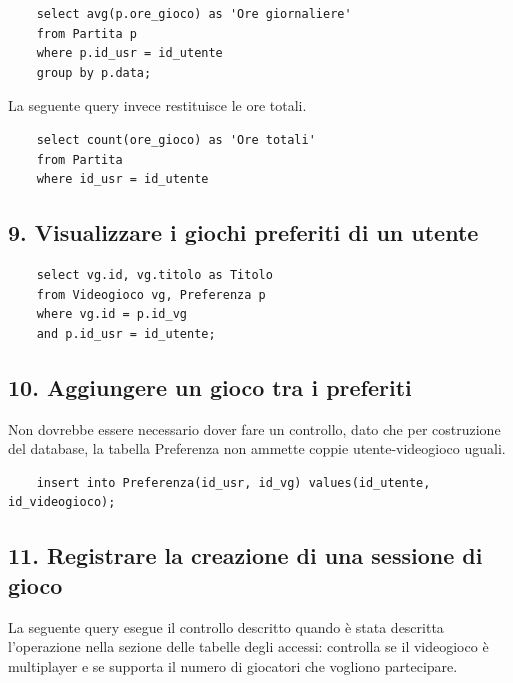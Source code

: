 \documentclass[a4paper,12pt]{report}
\begin{document}
    \begin{lstlisting}
    select avg(p.ore_gioco) as 'Ore giornaliere'
    from Partita p
    where p.id_usr = id_utente
    group by p.data;
    \end{lstlisting}

La seguente query invece restituisce le ore totali.

    \begin{lstlisting}
    select count(ore_gioco) as 'Ore totali'
    from Partita
    where id_usr = id_utente
    \end{lstlisting}

\subsection*{9. Visualizzare i giochi preferiti di un utente}

    \begin{lstlisting}
    select vg.id, vg.titolo as Titolo
    from Videogioco vg, Preferenza p
    where vg.id = p.id_vg
    and p.id_usr = id_utente;
    \end{lstlisting}

\subsection*{10. Aggiungere un gioco tra i preferiti}

Non dovrebbe essere necessario dover fare un controllo, dato che per costruzione del database, la tabella Preferenza non ammette coppie utente-videogioco uguali.


    \begin{lstlisting}
    insert into Preferenza(id_usr, id_vg) values(id_utente, id_videogioco);
    \end{lstlisting}

\subsection*{11. Registrare la creazione di una sessione di gioco}

La seguente query esegue il controllo descritto quando è stata descritta l'operazione nella sezione delle tabelle degli accessi: controlla se il videogioco è multiplayer e se supporta il numero di giocatori che vogliono partecipare.
\end{document}
